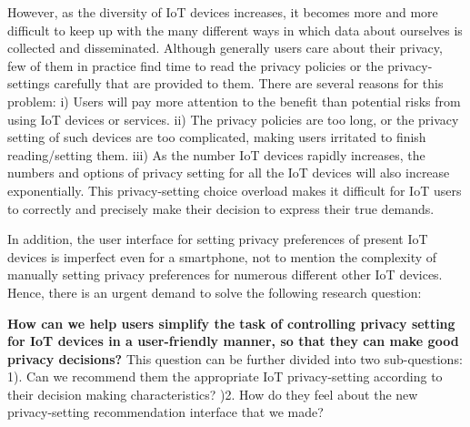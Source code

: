 However, as the diversity of IoT devices increases, it becomes more and more difficult to keep up with the many different ways in which data about ourselves is collected and disseminated. Although generally users care about their privacy, few of them in practice find time to read the privacy policies or the privacy-settings carefully that are provided to them. There are several reasons for this problem: i) Users will pay more attention to the benefit than potential risks from using IoT devices or services. ii) The privacy policies are too long, or the privacy setting of such devices are too complicated, making users irritated to finish reading/setting them. iii) As the number IoT devices rapidly increases, the numbers and options of privacy setting for all the IoT devices will also increase exponentially. This privacy-setting choice overload makes it difficult for IoT users to correctly and precisely make their decision to express their true demands. 

In addition, the user interface for setting privacy preferences of present IoT devices is imperfect even for a smartphone, not to mention the complexity of manually setting privacy preferences for numerous different other IoT devices. Hence, there is an urgent demand to solve the following research question: 

\textbf{How can we help users simplify the task of controlling privacy setting for IoT devices in a user-friendly manner, so that they can make good privacy decisions?} This question can be further divided into two sub-questions: 1). Can we recommend them the appropriate IoT privacy-setting according to their decision making characteristics? )2. How do they feel about the new privacy-setting recommendation interface that we made?


